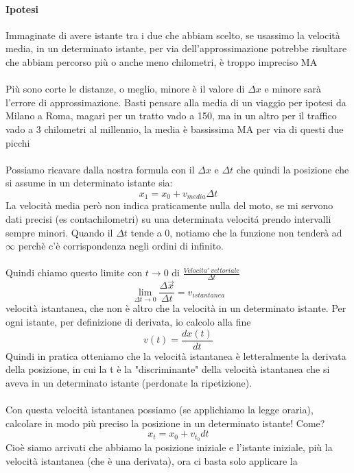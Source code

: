 \documentclass[12pt, a4paper, openany, oneside]{book}
\begin{document}
\paragraph{Ipotesi} Immaginate di avere istante tra i due che abbiam scelto,
se usassimo la velocità media, in un determinato istante, per via dell'approssimazione
potrebbe risultare che abbiam percorso più o anche meno chilometri, è troppo
impreciso MA
\\ \\
Più sono corte le distanze, o meglio, minore è il valore di $\Delta x$ e minore
sarà l'errore di approssimazione. Basti pensare alla media di un viaggio per
ipotesi da Milano a Roma, magari per un tratto vado a 150, ma in un altro per 
il traffico vado a 3 chilometri al millennio, la media è bassissima MA per via
di questi due picchi
\\ \\
Possiamo ricavare dalla nostra formula con il $\Delta x$ e $\Delta t$ che quindi
la posizione che si assume in un determinato istante sia:
\[x_{1} = x_{0} + v_{media} \Delta t\]
La velocità media però non indica praticamente nulla del moto, se mi servono dati
precisi (es contachilometri) su una determinata velocitá prendo intervalli sempre minori.
Quando il $\Delta t$ tende a 0, notiamo che la funzione non tenderà ad $\infty$ 
perchè c'è corrispondenza negli ordini di infinito.\\ \\
Quindi chiamo questo limite con $t \to 0$ di $\frac{Velocita'~vettoriale}{\Delta t}$ 
\[\lim_{\Delta t \to 0} \frac{\Delta \vec{x}}{\Delta t} = v_{istantanea}\]
velocità istantanea, che non è altro che la velocità in un determinato istante.
Per ogni istante, per definizione di derivata, io calcolo alla fine 
\[v(t) = \frac{dx(t)}{dt}\]
Quindi in pratica otteniamo che la velocità istantanea è letteralmente la 
derivata della posizione, in cui la t è la "discriminante" della velocità istantanea che si 
aveva in un determinato istante (perdonate la ripetizione).
\\ \\ 
Con questa velocità istantanea possiamo (se applichiamo la legge oraria), 
calcolare in modo più preciso la posizione in un determinato istante! Come?
\[x_{t} = x_{0} + v_{t_{0}} dt\]
Cioè siamo arrivati che abbiamo la posizione iniziale e l'istante iniziale, più
la velocità istantanea (che è una derivata), ora ci basta solo applicare la 
\end{document}
